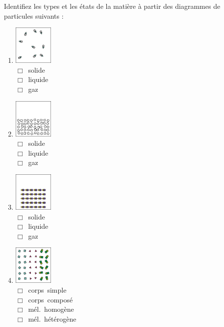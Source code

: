 \documentclass[
  11pt,
  a4paper,
  openany]{book}
\begin{document}
\begin{Exercise}

Identifiez les types et les états de la matière à partir des diagrammes de particules suivants :

\begin{multicols}{3}

\begin{enumerate}
\def\labelenumi{\alph{enumi}.}
\item
  \includegraphics[width=0.15\textwidth,height=\textheight]{images/melanges-corps-purs-60-a.png}\\
  \(\Box\)~solide\\
  \(\Box\)~liquide\\
  \(\Box\)~gaz
\item
  \includegraphics[width=0.15\textwidth,height=\textheight]{images/melanges-corps-purs-60-b.png}\\
  \(\Box\)~solide\\
  \(\Box\)~liquide\\
  \(\Box\)~gaz
\item
  \includegraphics[width=0.15\textwidth,height=\textheight]{images/melanges-corps-purs-60-c.png}\\
  \(\Box\)~solide\\
  \(\Box\)~liquide\\
  \(\Box\)~gaz
\item
  \includegraphics[width=0.15\textwidth,height=\textheight]{images/melanges-corps-purs-60-d.png}\\
  \(\Box\)~corps~simple\\
  \(\Box\)~corps~composé\\
  \(\Box\)~mél.~homogène\\
  \(\Box\)~mél.~hétérogène
\end{enumerate}


\end{multicols}
\end{Exercise}
\end{document}
